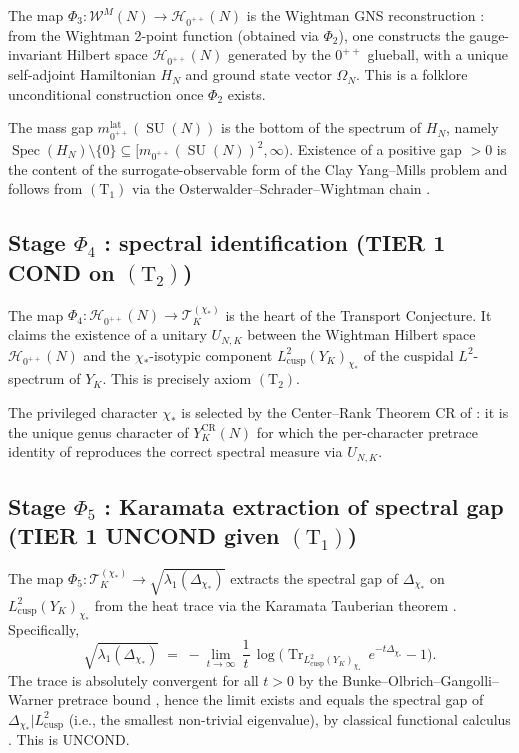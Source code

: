 \documentclass[11pt,a4paper,reqno]{amsart}
\theoremstyle{definition}
\DeclareMathOperator{\SU}{SU}
\DeclareMathOperator{\Tr}{Tr}
\DeclareMathOperator{\Spec}{Spec}
\newcommand{\YK}{Y_K}
\newcommand{\YKCR}{Y_K^{\mathrm{CR}}}
\newcommand{\Phii}[1]{\Phi_{#1}}
\newcommand{\Lcusp}{L^2_{\mathrm{cusp}}}
\newcommand{\Cone}{(\mathrm{T}_{1})}
\newcommand{\Ctwo}{(\mathrm{T}_{2})}
\begin{document}
The map $\Phii{3} : \mathcal{W}^M(N)\to\mathcal{H}_{0^{++}}(N)$ is
the Wightman GNS reconstruction \cite[\S\S 3]{StreaterWightman1964}:
from the Wightman 2-point function (obtained via $\Phii{2}$), one
constructs the gauge-invariant Hilbert space $\mathcal{H}_{0^{++}}(N)$
generated by the $0^{++}$ glueball, with a unique self-adjoint
Hamiltonian $H_N$ and ground state vector $\Omega_N$. This is a
folklore unconditional construction once $\Phii{2}$ exists.

The mass gap $m_{0^{++}}^{\mathrm{lat}}(\SU(N))$ is the bottom of the
spectrum of $H_N$, namely $\Spec(H_N)\setminus\{0\}\subseteq
[m_{0^{++}}(\SU(N))^2,\infty)$. Existence of a positive gap $>0$ is
the content of the surrogate-observable form of the Clay Yang--Mills
problem and follows from $\Cone$ via the
Osterwalder--Schrader--Wightman chain \cite[\S 3.3]{OsterwalderSchrader1973}.

\subsection{Stage $\Phii{4}$ : spectral identification (TIER 1 COND on
  $\Ctwo$)}\label{ss:phi4}

The map $\Phii{4} : \mathcal{H}_{0^{++}}(N)\to\mathcal{T}^{(\chi_*)}_K$
is the heart of the Transport Conjecture. It claims the existence of
a unitary $U_{N,K}$ between the Wightman Hilbert space
$\mathcal{H}_{0^{++}}(N)$ and the $\chi_*$-isotypic component
$\Lcusp(\YK)_{\chi_*}$ of the cuspidal $L^2$-spectrum of $\YK$.
This is precisely axiom $\Ctwo$.

The privileged character $\chi_*$ is selected by the Center--Rank
Theorem CR of \cite{Remondiere2026CenterRank}: it is the unique
genus character of $\YKCR(N)$ for which the per-character pretrace
identity of \cite{Remondiere2026Selberg} reproduces the correct
spectral measure via $U_{N,K}$.

\subsection{Stage $\Phii{5}$ : Karamata extraction of spectral gap (TIER
  1 UNCOND given $\Cone$)}\label{ss:phi5}

The map $\Phii{5} : \mathcal{T}^{(\chi_*)}_K\to
\sqrt{\lambda_1(\Delta_{\chi_*})}$ extracts the spectral gap of
$\Delta_{\chi_*}$ on $\Lcusp(\YK)_{\chi_*}$ from the heat trace via
the Karamata Tauberian theorem
\cite[\S 4]{Remondiere2026RouteB}. Specifically,
\[
   \sqrt{\lambda_1(\Delta_{\chi_*})}
   \;=\; -\lim_{t\to\infty}\,\frac{1}{t}\,
   \log\bigl(\Tr_{\Lcusp(\YK)_{\chi_*}}\,e^{-t\Delta_{\chi_*}} - 1\bigr).
\]
The trace is absolutely convergent for all $t>0$ by the
Bunke--Olbrich--Gangolli--Warner pretrace bound
\cite[\S 2.2]{BunkeOlbrich1995}, hence the limit exists and equals
the spectral gap of $\Delta_{\chi_*}|\Lcusp$ (i.e., the smallest
non-trivial eigenvalue), by classical functional calculus
\cite[Ch.~VIII.6]{ReedSimonIV}. This is UNCOND.
\end{document}
